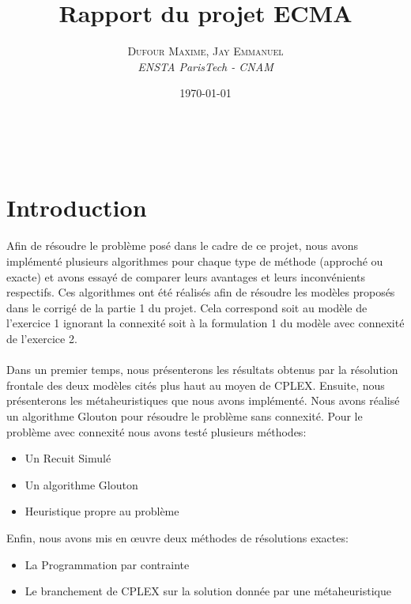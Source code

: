 \documentclass[a4paper, 11pt]{article} %
\title{\textbf{Rapport du projet ECMA}} %
\author{\textsc{Dufour Maxime, Jay Emmanuel} %
\\{\textit{ENSTA ParisTech - CNAM}}} %
\date{\today} %
\makeatletter
\renewcommand{\maketitle}{ %
\begin{flushright} %
{\LARGE\@title} %

\vspace{30pt} %

{\large\@author} %
\\\@date %

\vspace{20pt} %
\end{flushright}
}
\makeatother
\begin{document}
\vspace{200pt}

\maketitle %

\section*{Introduction}

\paragraph*{}
Afin de résoudre le problème posé dans le cadre de ce projet, nous avons implémenté plusieurs algorithmes pour chaque type de méthode (approché ou exacte) et avons essayé de comparer leurs avantages et leurs inconvénients respectifs. Ces algorithmes ont été réalisés afin de résoudre les modèles proposés dans le corrigé de la partie 1 du projet. Cela correspond soit au modèle de l'exercice 1 ignorant la connexité soit à la formulation 1 du modèle avec connexité de l'exercice 2.

\paragraph*{}
Dans un premier temps, nous présenterons les résultats obtenus par la résolution frontale des deux modèles cités plus haut au moyen de CPLEX. Ensuite, nous présenterons les métaheuristiques que nous avons implémenté. Nous avons réalisé un algorithme Glouton pour résoudre le problème sans connexité. Pour le problème avec connexité nous avons testé plusieurs méthodes:

\begin{itemize}
\item Un Recuit Simulé
\item Un algorithme Glouton
\item Heuristique propre au problème
\end{itemize}

Enfin, nous avons mis en œuvre deux méthodes de résolutions exactes:
\begin{itemize}
\item La Programmation par contrainte
\item Le branchement de CPLEX sur la solution donnée par une métaheuristique
\end{itemize}
\end{document}
